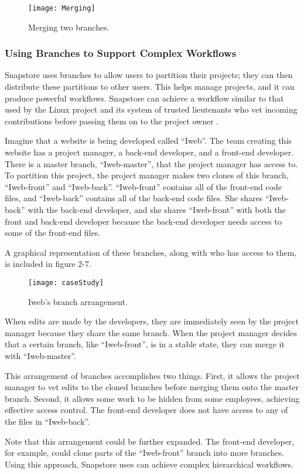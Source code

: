 \begin{figure}
\texttt{[image: Merging]}
\caption{Merging two branches.}
\label{arm:fig1}
\end{figure}

\subsubsection{Using Branches to Support Complex Workflows}

Snapstore uses branches to allow users to partition their projects; they can then distribute these partitions to other users. This helps manage projects, and it can produce powerful workflows. Snapstore can achieve a workflow similar to that used by the Linux project and its system of trusted lieutenants who vet incoming contributions before passing them on to the project owner \cite{linux}.

Imagine that a website is being developed called ``Iweb''. The team creating this website has a project manager, a back-end developer, and a front-end developer. There is a master branch, ``Iweb-master'', that the project manager has access to. To partition this project, the project manager makes two clones of this branch, ``Iweb-front'' and ``Iweb-back''. ``Iweb-front'' contains all of the front-end code files, and ``Iweb-back'' contains all of the back-end code files. She shares ``Iweb-back'' with the back-end developer, and she shares ``Iweb-front'' with both the front and back-end developer because the back-end developer needs access to some of the front-end files.

A graphical representation of these branches, along with who has access to them, is included in figure 2-7.

\begin{figure}
\texttt{[image: caseStudy]}
\caption{Iweb's branch arrangement.}
\label{arm:fig1}
\end{figure}

When edits are made by the developers, they are immediately seen by the project manager because they share the same branch. When the project manager decides that a certain branch, like ``Iweb-front'', is in a stable state, they can merge it with ``Iweb-master''.

This arrangement of branches accomplishes two things. First, it allows the project manager to vet edits to the cloned branches before merging them onto the master branch. Second, it allows some work to be hidden from some employees, achieving effective access control. The front-end developer does not have access to any of the files in ``Iweb-back''.

Note that this arrangement could be further expanded. The front-end developer, for example, could clone parts of the ``Iweb-front'' branch into more branches. Using this approach, Snapstore uses can achieve complex hierarchical workflows. 





